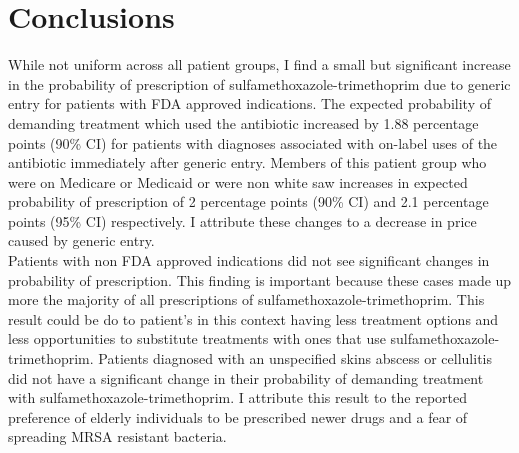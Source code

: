 \chapter{Conclusions}
While not uniform across all patient groups, I find a small but significant increase in the probability of prescription of sulfamethoxazole-trimethoprim due to generic entry for patients with FDA approved indications. The expected probability of demanding treatment which used the antibiotic increased by 1.88 percentage points (90\% CI) for patients with diagnoses associated with on-label uses of the antibiotic immediately after generic entry. Members of this patient group who were on Medicare or Medicaid or were non white saw increases in expected probability of prescription of 2 percentage points (90\% CI) and 2.1 percentage points (95\% CI) respectively. I attribute these changes to a decrease in price caused by generic entry.\\
\indent Patients with non FDA approved indications did not see significant changes in probability of prescription. This finding is important because these cases made up more the majority of all prescriptions of sulfamethoxazole-trimethoprim. This result could be do to patient's in this context having less treatment options and less opportunities to substitute treatments with ones that use sulfamethoxazole-trimethoprim. Patients diagnosed with an unspecified skins abscess or cellulitis did not have a significant change in their probability of demanding treatment with sulfamethoxazole-trimethoprim. I attribute this result to the reported preference of elderly individuals to be prescribed newer drugs and a fear of spreading MRSA resistant bacteria.

